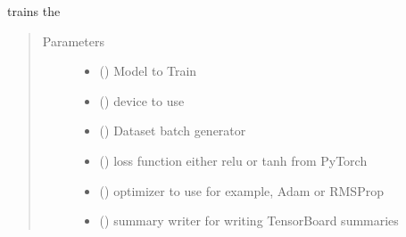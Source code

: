 \documentclass[letterpaper,10pt,english]{sphinxmanual}
\begin{document}

\begin{fulllineitems}
\label{\detokenize{docs/source/train:train.train_model.train}}
trains the 
\begin{quote}\begin{description}
\item[{Parameters}] \leavevmode\begin{itemize}
\item {} 
 ({\hyperref[\detokenize{docs/source/train:train.model.Generalised_Recurrent_Model}]{}}) \textendash{} Model to Train

\item {} 
 () \textendash{} device to use

\item {} 
 () \textendash{} Dataset batch generator

\item {} 
 () \textendash{} loss function either relu or tanh from PyTorch

\item {} 
 () \textendash{} optimizer to use for example, Adam or RMSProp

\item {} 
 () \textendash{} summary writer for writing TensorBoard summaries

\end{itemize}

\end{description}\end{quote}

\end{fulllineitems}
\end{document}
